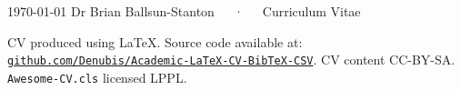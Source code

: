 \documentclass[11pt, a4paper]{awesome-cv}
\begin{document}
\makecvheader[C]

\makecvfooter
  {\today}
  {Dr Brian Ballsun-Stanton~~~·~~~Curriculum Vitae}
  {\thepage}


\vspace{0.5cm}











% 

% 
% 
% 
% 
% 




\vfill
{\tiny
CV produced using \LaTeX. Source code available at: \href{https://github.com/Denubis/Academic-LaTeX-CV-BibTeX-CSV}{\tt github.com/Denubis/Academic-LaTeX-CV-BibTeX-CSV}. CV content CC-BY-SA. {\tt Awesome-CV.cls} licensed LPPL.}

\end{document}

